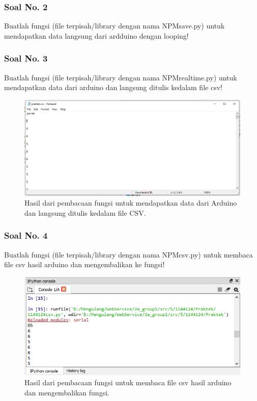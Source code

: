 \subsubsection{Soal No. 2}
Buatlah fungsi (file terpisah/library dengan nama NPMsave.py) untuk mendapatkan data langsung dari ardduino dengan looping!


\subsubsection{Soal No. 3}
Buatlah fungsi (file terpisah/library dengan nama NPMrealtime.py) untuk mendapatkan data dari arduino dan langsung ditulis kedalam file csv!


\begin{figure}[H]
	\includegraphics[width=12cm]{figures/5/1154121/Praktek/3.png}
	\centering
	\caption{Hasil dari pembacaan fungsi untuk mendapatkan data dari Arduino dan langsung ditulis kedalam file CSV.}
\end{figure}
\subsubsection{Soal No. 4}
Buatlah fungsi (file terpisah/library dengan nama NPMcsv.py) untuk membaca file csv hasil arduino dan mengembalikan ke fungsi!


\begin{figure}[H]
	\includegraphics[width=12cm]{figures/5/1154121/Praktek/csv.png}
	\centering
	\caption{Hasil dari pembacaan fungsi untuk membaca file csv hasil arduino dan mengembalikan fungsi.}
\end{figure}
